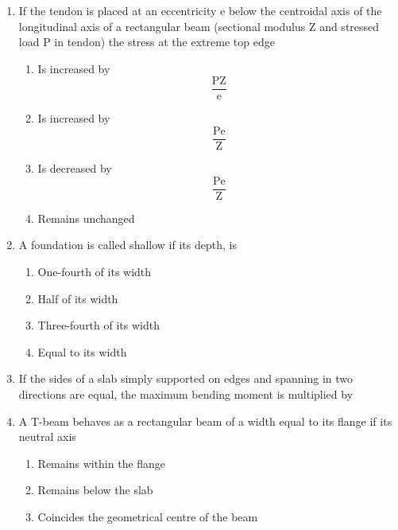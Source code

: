 \documentclass[11pt,a4paper]{article}
\begin{document}
\begin{enumerate}
\\
\item{If the tendon is placed at an eccentricity e below the centroidal axis of the longitudinal axis of a rectangular beam (sectional modulus Z and stressed load P in tendon) the stress at the extreme top edge}
\begin{enumerate}[label=\Alph*.]
\item{Is increased by $$\frac{{{\text{PZ}}}}{{\text{e}}}$$}
\item{Is increased by $$\frac{{{\text{Pe}}}}{{\text{Z}}}$$}
\item{Is decreased by $$\frac{{{\text{Pe}}}}{{\text{Z}}}$$}
\item{Remains unchanged}
\end{enumerate}
\item{A foundation is called shallow if its depth, is}
\begin{enumerate}[label=\Alph*.]
\item{One-fourth of its width}
\item{Half of its width}
\item{Three-fourth of its width}
\item{Equal to its width}
\end{enumerate}
\item{If the sides of a slab simply supported on edges and spanning in two directions are equal, the maximum bending moment is multiplied by}
\\
\item{A T-beam behaves as a rectangular beam of a width equal to its flange if its neutral axis}
\begin{enumerate}[label=\Alph*.]
\item{Remains within the flange}
\item{Remains below the slab}
\item{Coincides the geometrical centre of the beam}

\end{enumerate}
\end{enumerate}
\end{document}
